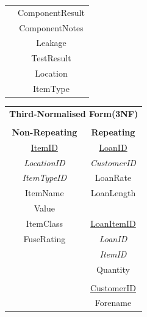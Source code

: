 \begin{center}
\begin{tabular}{|c|c|}
                               & ComponentResult                   \\
                               & ComponentNotes                    \\
                               & Leakage                           \\ 
                               & TestResult                        \\ 
                               & Location                          \\
                               & ItemType                          \\ \hline
    \end{tabular}
\end{center}

\begin{center}
    \begin{tabular}{|c|c|}
        \hline
        \multicolumn{2}{|c|}{\textbf{Third-Normalised Form(3NF)}}  \\
        \multicolumn{2}{|c|}{ }                                    \\ \hline
        \textbf{Non-Repeating}     & \textbf{Repeating}            \\ \hline
        \underline{ItemID}         & \underline{LoanID}            \\
        \emph{LocationID}          & \emph{CustomerID}             \\
        \emph{ItemTypeID}          & LoanRate                      \\
        ItemName                   & LoanLength                    \\ 
        Value	                  &                               \\
        ItemClass                  & \underline{LoanItemID}        \\
        FuseRating                 & \emph{LoanID}                 \\
                                   & \emph{ItemID}                 \\
                                   & Quantity                      \\
                                   &                               \\ 
                                   &\underline{CustomerID}         \\
                                   & Forename                      \\

\end{tabular}
\end{center}

